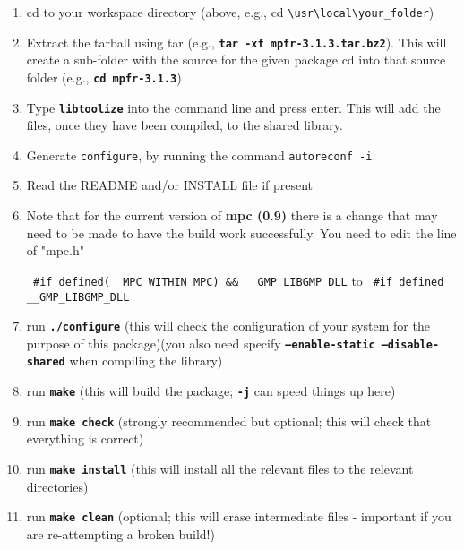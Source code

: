 \begin{enumerate}

\item cd to your workspace directory (above, e.g., cd {\texttt{\textbackslash{usr}\textbackslash{local}\textbackslash{your\_folder}}})
\item Extract the tarball using tar (e.g., \textbf{\texttt{tar -xf mpfr-3.1.3.tar.bz2}}). This will create a sub-folder with the source for the given package
cd into that source folder (e.g., \textbf{\texttt{cd mpfr-3.1.3}})
\item Type \textbf{\texttt{libtoolize}} into the command line and press enter. This will add the files, once they have been compiled, to the shared library.
\item Generate {\tt configure}, by running the command {\tt autoreconf -i}.
\item Read the README and/or INSTALL file if present
\item Note that for the current version of \textbf{mpc (0.9)} there is a change that may need to be made to have the build work successfully. You need to edit the line of "mpc.h"

\begin{minipage}{0.9\linewidth}
\centering
    \begingroup
    \texttt{%
    \#if defined(\_\_MPC\_WITHIN\_MPC) \&\& \_\_GMP\_LIBGMP\_DLL}
    to
    \texttt{%
    \#if defined \_\_GMP\_LIBGMP\_DLL}
    \endgroup
\end{minipage}

\item run \textbf{\texttt{./configure}} (this will check the configuration of your system for the purpose of this package)(you also need specify \textbf{\texttt{--enable-static --disable-shared}} when compiling the library)
\item run \textbf{\texttt{make}} (this will build the package; \textbf{\texttt{-j}} can speed things up here)
\item run \textbf{\texttt{make check}} (strongly recommended but optional; this will check that everything is correct)
\item run \textbf{\texttt{make install}} (this will install all the relevant files to the relevant directories)
\item run \textbf{\texttt{make clean}} (optional; this will erase intermediate files - important if you are re-attempting a broken build!)

\end{enumerate}









